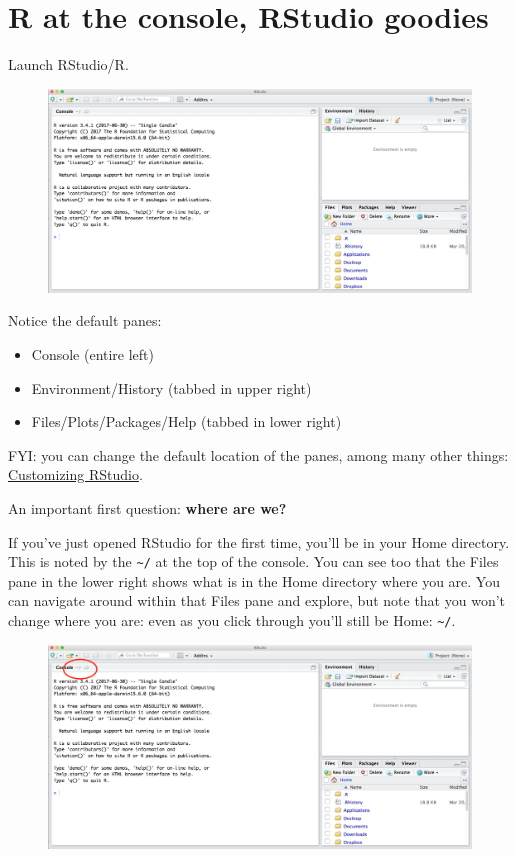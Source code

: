 \documentclass[]{book}
\providecommand{\tightlist}{%
  \setlength{\itemsep}{0pt}\setlength{\parskip}{0pt}}
\theoremstyle{definition}
\theoremstyle{definition}
\theoremstyle{definition}
\theoremstyle{remark}
\begin{document}
\section{R at the console, RStudio
goodies}\label{r-at-the-console-rstudio-goodies}

Launch RStudio/R.

\begin{figure}[htbp]
\centering
\includegraphics{img/RStudio_IDE.png}
\caption{}
\end{figure}

Notice the default panes:

\begin{itemize}
\tightlist
\item
  Console (entire left)
\item
  Environment/History (tabbed in upper right)
\item
  Files/Plots/Packages/Help (tabbed in lower right)
\end{itemize}

FYI: you can change the default location of the panes, among many other
things:
\href{https://support.rstudio.com/hc/en-us/articles/200549016-Customizing-RStudio}{Customizing
RStudio}.

An important first question: \textbf{where are we?}

If you've just opened RStudio for the first time, you'll be in your Home
directory. This is noted by the \texttt{\textasciitilde{}/} at the top
of the console. You can see too that the Files pane in the lower right
shows what is in the Home directory where you are. You can navigate
around within that Files pane and explore, but note that you won't
change where you are: even as you click through you'll still be Home:
\texttt{\textasciitilde{}/}.

\begin{figure}[htbp]
\centering
\includegraphics{img/RStudio_IDE_homedir.png}
\caption{}
\end{figure}
\end{document}
